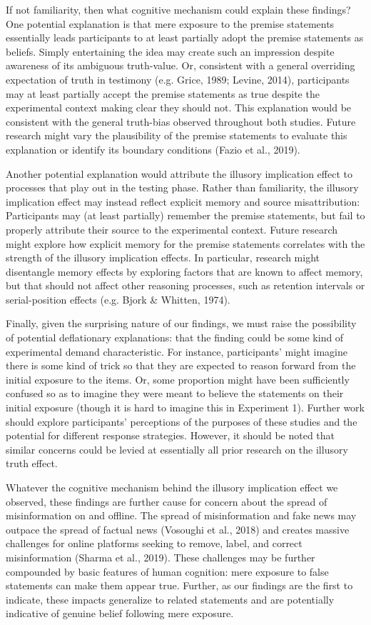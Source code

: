 \documentclass[10pt, letterpaper]{article}
\begin{document}
If not familiarity, then what cognitive mechanism could explain these
findings? One potential explanation is that mere exposure to the premise
statements essentially leads participants to at least partially adopt
the premise statements as beliefs. Simply entertaining the idea may
create such an impression despite awareness of its ambiguous
truth-value. Or, consistent with a general overriding expectation of
truth in testimony (e.g. Grice, 1989; Levine, 2014), participants may at
least partially accept the premise statements as true despite the
experimental context making clear they should not. This explanation
would be consistent with the general truth-bias observed throughout both
studies. Future research might vary the plausibility of the premise
statements to evaluate this explanation or identify its boundary
conditions (Fazio et al., 2019).

Another potential explanation would attribute the illusory implication
effect to processes that play out in the testing phase. Rather than
familiarity, the illusory implication effect may instead reflect
explicit memory and source misattribution: Participants may (at least
partially) remember the premise statements, but fail to properly
attribute their source to the experimental context. Future research
might explore how explicit memory for the premise statements correlates
with the strength of the illusory implication effects. In particular,
research might disentangle memory effects by exploring factors that are
known to affect memory, but that should not affect other reasoning
processes, such as retention intervals or serial-position effects (e.g.
Bjork \& Whitten, 1974).

Finally, given the surprising nature of our findings, we must raise the
possibility of potential deflationary explanations: that the finding
could be some kind of experimental demand characteristic. For instance,
participants' might imagine there is some kind of trick so that they are
expected to reason forward from the initial exposure to the items. Or,
some proportion might have been sufficiently confused so as to imagine
they were meant to believe the statements on their initial exposure
(though it is hard to imagine this in Experiment 1). Further work should
explore participants' perceptions of the purposes of these studies and
the potential for different response strategies. However, it should be
noted that similar concerns could be levied at essentially all prior
research on the illusory truth effect.

Whatever the cognitive mechanism behind the illusory implication effect
we observed, these findings are further cause for concern about the
spread of misinformation on and offline. The spread of misinformation
and fake news may outpace the spread of factual news (Vosoughi et al.,
2018) and creates massive challenges for online platforms seeking to
remove, label, and correct misinformation (Sharma et al., 2019). These
challenges may be further compounded by basic features of human
cognition: mere exposure to false statements can make them appear true.
Further, as our findings are the first to indicate, these impacts
generalize to related statements and are potentially indicative of
genuine belief following mere exposure.
\end{document}
